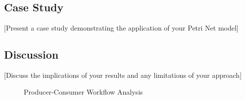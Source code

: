 \subsection{Case Study}

[Present a case study demonstrating the application of your Petri Net model]

\subsection{Discussion}

[Discuss the implications of your results and any limitations of your approach]

\begin{figure}[htbp]
\centering
\resizebox{0.9\columnwidth}{!}{}
\caption{Producer-Consumer Workflow Analysis}
\label{fig:producer_consumer_results}
\end{figure}